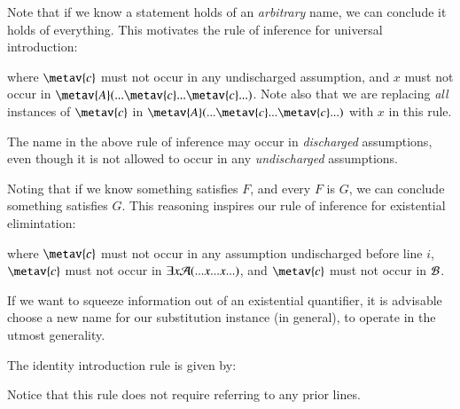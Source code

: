 \documentclass[12pt, a4paper, twoside, openright, titlepage]{book}
\begin{document}
\begin{defn}{}{}
    Note that if we know a statement holds of an \emph{arbitrary} name, we can conclude it holds of everything. This motivates the rule of inference for universal introduction: 
    \begin{fitchproof}
         
    \end{fitchproof}
    where $\metav{c}$ must not occur in any undischarged assumption, and $x$ must not occur in $\metav{A}(...\metav{c}...\metav{c}...)$. Note also that we are replacing \emph{all} instances of $\metav{c}$ in $\metav{A}(...\metav{c}...\metav{c}...)$ with $x$ in this rule.
\end{defn}

The name in the above rule of inference may occur in \emph{discharged} assumptions, even though it is not allowed to occur in any \emph{undischarged} assumptions.



\begin{defn}{}{}
    Noting that if we know something satisfies $F$, and every $F$ is $G$, we can conclude something satisfies $G$. This reasoning inspires our rule of inference for existential elimintation: 
    \begin{fitchproof}
        \open
        \close
         
    \end{fitchproof}
    where $\metav{c}$ must not occur in any assumption undischarged before line $i$, $\metav{c}$ must not occur in $\exists x\mathcal{A}(...x...x...)$, and $\metav{c}$ must not occur in $\mathcal{B}$.
\end{defn}

If we want to squeeze information out of an existential quantifier, it is advisable choose a new name for our substitution instance (in general), to operate in the utmost generality.


\begin{defn}{}{}
    The identity introduction rule is given by:
    \begin{fitchproof}
         
    \end{fitchproof}
    Notice that this rule does not require referring to any prior lines.
\end{defn}
\end{document}
